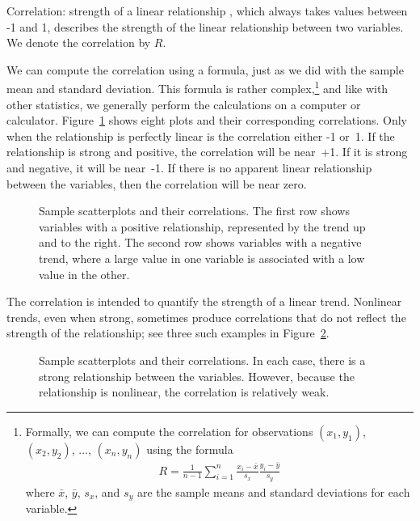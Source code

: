 \begin{onebox}{Correlation: strength of a linear relationship}
  , which always takes values
  between -1 and 1, describes the strength of the linear
  relationship between two variables.
  We denote the correlation by $R$.
\end{onebox}

We can compute the correlation using a formula, just as we did
with the sample mean and standard deviation.
This formula is rather complex,\footnote{Formally,
  we can compute the correlation for observations $(x_1, y_1)$,
  $(x_2, y_2)$, ..., $(x_n, y_n)$ using the formula
  \begin{align*}
  R = \frac{1}{n-1}
      \sum_{i=1}^{n} \frac{x_i-\bar{x}}{s_x}\frac{y_i-\bar{y}}{s_y}
  \end{align*}
  where $\bar{x}$, $\bar{y}$, $s_x$, and $s_y$ are the sample
  means and standard deviations for each variable.}
and like with other statistics, we generally perform the
calculations on a computer or calculator.
Figure~\ref{posNegCorPlots} shows eight plots and their
corresponding correlations.
Only when the relationship is perfectly linear is the
correlation either -1 or~1.
If the relationship is strong and positive, the correlation
will be near~+1.
If it is strong and negative, it will be near~-1.
If there is no apparent linear relationship between the
variables, then the correlation will be near zero.

\begin{figure}
   \centering
   \caption{Sample scatterplots and their correlations.
       The first row shows variables with a positive
       relationship, represented by the trend up and to
       the right.
       The second row shows variables with a negative trend,
       where a large value in one variable is associated with
       a low value in the other.}
   \label{posNegCorPlots}
\end{figure}

The correlation is intended to quantify the strength of a linear trend. Nonlinear trends, even when strong, sometimes produce correlations that do not reflect the strength of the relationship; see three such examples in Figure~\ref{corForNonLinearPlots}.

\begin{figure}[h]
   \centering
   \caption{Sample scatterplots and their correlations.
       In each case, there is a strong relationship between
       the variables.
       However, because the relationship is nonlinear,
       the correlation is relatively weak.}
   \label{corForNonLinearPlots}
\end{figure}

